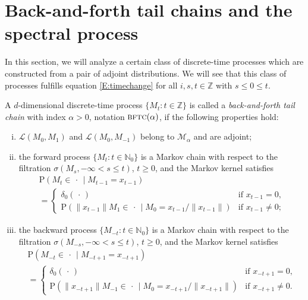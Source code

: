 \documentclass{aptpubarxiv}
\numberwithin{equation}{section}
\begin{document}
\section{Back-and-forth tail chains  and the spectral process}
\label{S:BFTC}

In this section, we will analyze a certain class of discrete-time processes which are constructed from a pair of adjoint distributions. We will see that this class of processes fulfills equation \eqref{E:timechange} for all $i,s,t \in \mathbb{Z}$ with $s \leq 0 \leq t$. 

\begin{defn}
\label{D:BFTC}
A $d$-dimensional discrete-time process $\{M_t:t \in {\mathbb{Z}}\}$ is called a \emph{back-and-forth tail chain} with index $\alpha>0$, notation ${\mbox{\sc bftc}}(\alpha)$, if the following properties hold:
\begin{enumerate}[(i)]
\item ${\mathcal{L}}(M_0, M_1)$ and ${\mathcal{L}}(M_0, M_{-1})$ belong to $\mathcal{M}_\alpha$ and are adjoint;
\item the forward process $\{M_t:t \in {\mathbb{N}}_0\}$ is a Markov chain with respect to the filtration \linebreak $\sigma( M_s, -\infty < s \le t)$, $t \ge 0$, and the Markov kernel satisfies
\begin{multline*}
  {\mathrm{P}}( M_t \in \,\cdot\, \mid M_{t-1} = x_{t-1}) \\
  = \begin{cases} 
      \delta_0(\,\cdot\,) & \text{if $x_{t-1} = 0$,} \\
      {\mathrm{P}}( {\|{x_{t-1}}\|} M_1 \in \,\cdot\, \mid M_0 = x_{t-1}/{\|{x_{t-1}}\|} ) & \text{if $x_{t-1} \neq 0$;}
    \end{cases}
\end{multline*}
\item the backward process $\{M_{-t}:t \in {\mathbb{N}}_0\}$ is a Markov chain with respect to the filtration $\sigma( M_{-s}, -\infty < s \le t)$, $t \ge 0$, and the Markov kernel satisfies
\begin{multline*}
  {\mathrm{P}}( M_{-t} \in \,\cdot\, \mid M_{-t+1} = x_{-t+1}) \\
  = \begin{cases} 
      \delta_0(\,\cdot\,) & \text{if $x_{-t+1} = 0$,} \\
      {\mathrm{P}}( {\|{x_{-t+1}}\|} M_{-1} \in \,\cdot\, \mid M_0 = x_{-t+1}/{\|{x_{-t+1}}\|} ) & \text{if $x_{-t+1} \neq 0$.}
    \end{cases}
\end{multline*}
\end{enumerate}
\end{defn}
 
\end{document}
